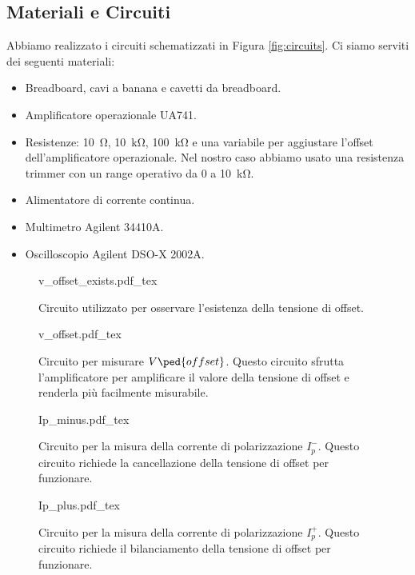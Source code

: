 \subsection{Materiali e Circuiti}

Abbiamo realizzato i circuiti schematizzati in Figura \ref{fig:circuits}.
Ci siamo serviti dei seguenti materiali:

\begin{itemize}
    \item{Breadboard, cavi a banana e cavetti da breadboard.}
    \item{Amplificatore operazionale UA741.}
    \item{Resistenze: \SI{10}{\ohm}, \SI{10}{\kilo\ohm}, \SI{100}{\kilo\ohm}
        e una variabile per aggiustare l'offset dell'amplificatore operazionale.
        Nel nostro caso abbiamo usato una resistenza trimmer con un range operativo da 0
        a \SI{10}{\kilo\ohm}.}
    \item{Alimentatore di corrente continua.}
    \item{Multimetro Agilent 34410A.}
    \item{Oscilloscopio Agilent DSO-X 2002A.}
\end{itemize}

\begin{figure*}[b]
        \centering
        \small
        \begin{subfigure}[b]{0.35\textwidth}
            \def\svgwidth{\columnwidth}
            {v_offset_exists.pdf_tex}
            \caption{Circuito utilizzato per osservare l'esistenza della tensione di offset.}
            \label{fig:v_off_exists}
        \end{subfigure}
        \quad
        \begin{subfigure}[b]{0.48\textwidth}
            \def\svgwidth{\columnwidth}
            {v_offset.pdf_tex}
            \caption{Circuito per misurare $V\ped{offset}$. Questo circuito sfrutta l'amplificatore
                per amplificare il valore della tensione di offset e renderla più facilmente misurabile.}
            \label{fig:v_off_circ}
        \end{subfigure}
        \quad
        \begin{subfigure}[b]{0.48\textwidth}
            \def\svgwidth{\columnwidth}
            {Ip_minus.pdf_tex}
            \caption{Circuito per la misura della corrente di polarizzazione $I_p^-$. Questo circuito
                richiede la cancellazione della tensione di offset per funzionare.}
            \label{fig:ip_minus_circ}
        \end{subfigure}
        \quad
        \begin{subfigure}[b]{0.48\textwidth}
            \def\svgwidth{\columnwidth}
            {Ip_plus.pdf_tex}
            \caption{Circuito per la misura della corrente di polarizzazione $I_p^+$. Questo circuito
                richiede il bilanciamento della tensione di offset per funzionare.}
            \label{fig:ip_minus_circ}
        \end{subfigure}
        \caption{Circuiti costruiti durante l'esperienza}
        \label{fig:circuits}
\end{figure*}
